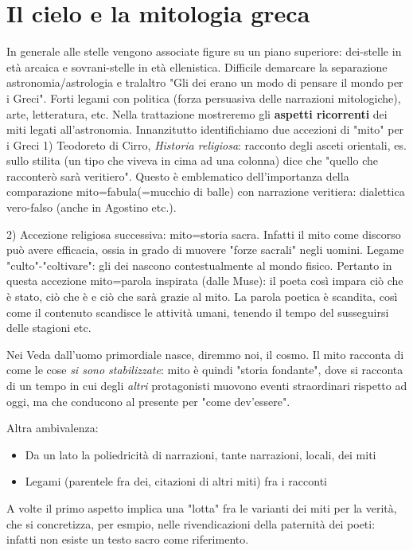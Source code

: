 \documentclass[main.tex]{subfiles}
\begin{document}
\section{Il cielo e la mitologia greca}



In generale alle stelle vengono associate figure su un piano superiore: dei-stelle in età arcaica e sovrani-stelle in età ellenistica.
Difficile demarcare la separazione astronomia/astrologia e tralaltro "Gli dei erano un modo di pensare il mondo per i Greci". Forti legami con politica (forza persuasiva delle narrazioni mitologiche), arte, letteratura, etc.
Nella trattazione mostreremo gli \textbf{aspetti ricorrenti} dei miti legati all'astronomia.
Innanzitutto identifichiamo due accezioni di "mito" per i Greci
1) Teodoreto di Cirro, \textit{Historia religiosa}: racconto degli asceti orientali, es. sullo stilita (un tipo che viveva in cima ad una colonna) dice che "quello che racconterò sarà veritiero". Questo è emblematico dell'importanza della comparazione mito=fabula(=mucchio di balle) con narrazione veritiera: dialettica vero-falso (anche in Agostino etc.).

2) Accezione religiosa successiva: mito=storia sacra. Infatti il mito come discorso può avere efficacia, ossia in grado di muovere "forze sacrali" negli uomini. Legame "culto"-"coltivare": gli dei nascono contestualmente al mondo fisico. Pertanto in questa accezione mito=parola inspirata (dalle Muse): il poeta così impara ciò che è stato, ciò che è e ciò che sarà grazie al mito. La parola poetica è scandita, così come il contenuto scandisce le attività umani, tenendo il tempo del susseguirsi delle stagioni etc.

Nei Veda dall'uomo primordiale nasce, diremmo noi, il cosmo. Il mito racconta di come le cose \textit{si sono stabilizzate}: mito è quindi "storia fondante", dove si racconta di un tempo in cui degli \textit{altri} protagonisti muovono eventi straordinari rispetto ad oggi, ma che conducono al presente per "come dev'essere".

Altra ambivalenza:
\begin{itemize}
    \item Da un lato la poliedricità di narrazioni, tante narrazioni, locali, dei miti
    \item Legami (parentele fra dei, citazioni di altri miti) fra i racconti
\end{itemize}
A volte il primo aspetto implica una "lotta" fra le varianti dei miti per la verità, che si concretizza, per esmpio, nelle rivendicazioni della paternità dei poeti: infatti non esiste un testo sacro come riferimento.
\end{document}
